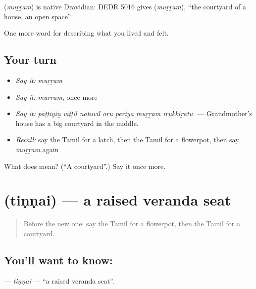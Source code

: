 \begin{cousinweb}
\textbf{} (\emph{muṟṟam}) is native Dravidian: DEDR 5016 gives  (\emph{muṟṟam}), \textquotedblleft{}the courtyard of a house, an open space\textquotedblright{}.
\end{cousinweb}

\begin{grammarlens}[title={What you've built}]
One more word for describing what you lived and felt.
\end{grammarlens}

\subsection*{Your turn}
\begin{itemize}
\raggedright
  \item \emph{Say it:} \emph{muṟṟam}
  \item \emph{Say it:} \emph{muṟṟam}, once more
  \item \emph{Say it:} \emph{pāṭṭiyiṉ vīṭṭil naṭuvil oru periya muṟṟam irukkiṟatu.} — Grandmother's house has a big courtyard in the middle.
  \item \emph{Recall:} say the Tamil for a latch, then the Tamil for a flowerpot, then say \emph{muṟṟam} again
\end{itemize}

\begin{tcolorbox}[breakable,colback=teal!4,colframe=teal!35!black,title={Before you move on}]
What does  mean? (\textquotedblleft{}A courtyard\textquotedblright{}.) Say it once more.
\end{tcolorbox}
\section[\texorpdfstring{\ta{திண்ணை} (tiṇṇai)}{திண்ணை (tiṇṇai)}]{ (tiṇṇai) — a raised veranda seat}

\label{lesson:TA-C522-tinnai}



\begin{quote}
Before the new one: say the Tamil for a flowerpot, then the Tamil for a courtyard.
\end{quote}

\subsection*{You'll want to know: }
\textbf{} — \emph{tiṇṇai} — \textquotedblleft{}a raised veranda seat\textquotedblright{}.

